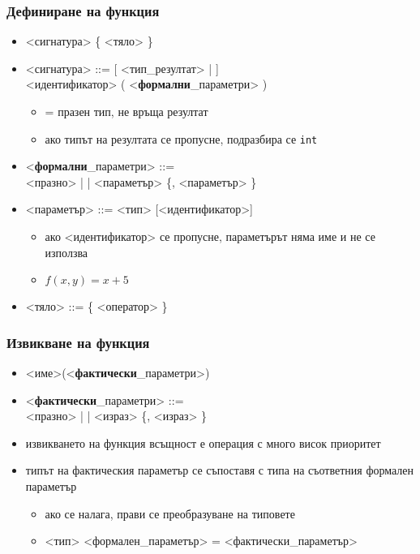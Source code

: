 \documentclass[alsotrans]{beamerswitch}
\begin{document}
\begin{frame}
  \frametitle{Дефиниране на функция}

  \begin{itemize}[<+->]
  \item{} <сигнатура> \tta\{ <тяло> \tta\}
  \item{} <сигнатура> ::= [ <тип\_резултат> |  ]\\
    <идентификатор> \tta( <\textbf{формални}\_параметри> \tta)
    \begin{itemize}
    \item {} = празен тип, не връща резултат
    \item ако типът на резултата се пропусне, подразбира се \tt{int}
    \end{itemize}
  \item{} <\textbf{формални}\_параметри> ::=  \\
    <празно> |  | <параметър> \{\tta, <параметър> \}
  \item{} <параметър> ::= <тип> [<идентификатор>]
    \begin{itemize}
    \item ако <идентификатор> се пропусне, параметърът няма име и не се използва
    \item \exa $f(x,y) = x + 5$
    \end{itemize}
  \item{} <тяло> ::= \tta\{ <оператор> \tta\}
  \end{itemize}
\end{frame}

\begin{frame}
  \frametitle{Извикване на функция}

  \begin{itemize}[<+->]
  \item{} <име>\tta(<\textbf{фактически}\_параметри>\tta)
  \item{} <\textbf{фактически}\_параметри> ::= \\
    <празно> |  | <израз> \{\tta, <израз> \}
  \item извикването на функция всъщност е \alert{операция} с много висок приоритет
  \item типът на фактическия параметър се съпоставя с типа на съответния формален параметър
    \begin{itemize}
    \item ако се налага, прави се преобразуване на типовете
    \item{} <тип> <формален\_параметър> = <фактически\_параметър>
    \end{itemize}
  \end{itemize}
\end{frame}
\end{document}
